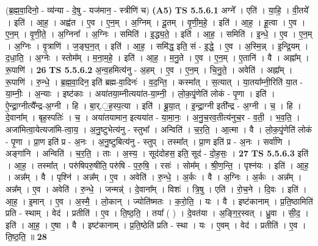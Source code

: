 \documentclass[17pt]{extarticle}
\begin{document}
                  \newline
                      (ब्र॒ह्म॒वा॒दिनो॒ - व्य॑न्या - दे॒षु - यज॑मान॒ - स्त्रीणि॑ च)  \textbf{(A5)} \newline \newline
                                \textbf{ TS 5.5.6.1} \newline
                  अग्ने᳚ । एति॑ । या॒हि॒ । वी॒तये᳚ । इति॑ । आ॒ह॒ । अह्व॑त । ए॒व । ए॒न॒म् । अ॒ग्निम् । दू॒तम् । वृ॒णी॒म॒हे॒ । इति॑ । आ॒ह॒ । हू॒त्वा । ए॒व । ए॒न॒म् । वृ॒णी॒ते॒ । अ॒ग्निना᳚ । अ॒ग्निः । समिति॑ । इ॒द्ध्य॒ते॒ । इति॑ । आ॒ह॒ । समिति॑ । इ॒न्धे॒ । ए॒व । ए॒न॒म् । अ॒ग्निः । वृ॒त्राणि॑ । ज॒ङ्घ॒न॒त् । इति॑ । आ॒ह॒ । समि॑द्ध॒ इति॒ सं - इ॒द्धे॒ । ए॒व । अ॒स्मि॒न्न् । इ॒न्द्रि॒यम् । द॒धा॒ति॒ । अ॒ग्नेः । स्तोम᳚म् । म॒ना॒म॒हे॒ । इति॑ । आ॒ह॒ । म॒नु॒ते । ए॒व । ए॒न॒म् । ए॒तानि॑ । वै । अह्ना᳚म् । रू॒पाणि॑ । \textbf{  26} \newline
                  \newline
                                \textbf{ TS 5.5.6.2} \newline
                  अ॒न्व॒हमित्य॑नु - अ॒हम् । ए॒व । ए॒न॒म् । चि॒नु॒ते॒ । अवेति॑ । अह्ना᳚म् । रू॒पाणि॑ । रु॒न्धे॒ । ब्र॒ह्म॒वा॒दिन॒ इति॑ ब्रह्म-वा॒दिनः॑ । व॒द॒न्ति॒ । कस्मा᳚त् । स॒त्यात् । या॒तया᳚म्नी॒रिति॑ या॒त - या॒म्नीः॒ । अ॒न्याः । इष्ट॑काः । अया॑तया॒म्नीत्यया॑त-या॒म्नी॒ । लो॒क॒पृं॒णेति॑ लोकं - पृ॒णा । इति॑ । ऐ॒न्द्रा॒ग्नीत्यै᳚न्द्र-अ॒ग्नी । हि । बा॒र्.॒ह॒स्प॒त्या । इति॑ । ब्रू॒या॒त् । इ॒न्द्रा॒ग्नी इती᳚न्द्र - अ॒ग्नी । च॒ । हि । दे॒वाना᳚म् । बृह॒स्पतिः॑ । च॒ । अया॑तयामान॒ इत्यया॑त - या॒मा॒नः॒ । अ॒नु॒च॒रव॒तीत्य॑नुच॒र - व॒ती॒ । भ॒व॒ति॒ । अजा॑मित्वा॒येत्यजा॑मि-त्वा॒य॒ । अ॒नु॒ष्टुभेत्य॑नु - स्तुभा᳚ । अन्विति॑ । च॒र॒ति॒ । आ॒त्मा । वै । लो॒क॒पृं॒णेति॑ लोकं - पृ॒णा । प्रा॒ण इति॑ प्र - अ॒नः । अ॒नु॒ष्टुबित्य॑नु - स्तुप् । तस्मा᳚त् । प्रा॒ण इति॑ प्र - अ॒नः । सर्वा॑णि । अङ्गा॑नि । अन्विति॑ । च॒र॒ति॒ । ताः । अ॒स्य॒ । सूद॑दोहस॒ इति॒ सूद॑ - दो॒ह॒सः॒ । \textbf{  27} \newline
                  \newline
                                \textbf{ TS 5.5.6.3} \newline
                  इति॑ । आ॒ह॒ । तस्मा᳚त् । परु॑षिपरु॒षीति॒ परु॑षि - प॒रु॒षि॒ । रसः॑ । सोम᳚म् । श्री॒ण॒न्ति॒ । पृश्न॑यः । इति॑ । आ॒ह॒ । अन्न᳚म् । वै । पृश्नि॑ । अन्न᳚म् । ए॒व । अवेति॑ । रु॒न्धे॒ । अ॒र्कः । वै । अ॒ग्निः । अ॒र्कः । अन्न᳚म् । अन्न᳚म् । ए॒व । अवेति॑ । रु॒न्धे॒ । जन्मन्न्॑ । दे॒वाना᳚म् । विशः॑ । त्रि॒षु । एति॑ । रो॒च॒ने । दि॒वः । इति॑ । आ॒ह॒ । इ॒मान् । ए॒व । अ॒स्मै॒ । लो॒कान् । ज्योति॑ष्मतः । क॒रो॒ति॒ । यः । वै । इष्ट॑कानाम् । प्र॒ति॒ष्ठामिति॑ प्रति - स्थाम् । वेद॑ । प्रतीति॑ । ए॒व । ति॒ष्ठ॒ति॒ । तया᳚ ( ) । दे॒वत॑या । अ॒ङ्गि॒र॒स्वत् । ध्रु॒वा । सी॒द॒ । इति॑ । आ॒ह॒ । ए॒षा । वै । इष्ट॑कानाम् । प्र॒ति॒ष्ठेति॑ प्रति - स्था । यः । ए॒वम् । वेद॑ । प्रतीति॑ । ए॒व । ति॒ष्ठ॒ति॒ ॥ \textbf{  28 } \newline
\end{document}
